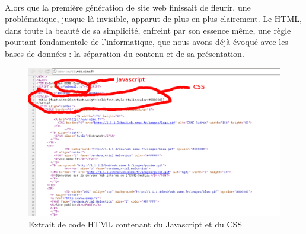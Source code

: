 {  
  \paragraph{} Alors que la première génération de site web finissait de fleurir, une
  problématique, jusque là invisible, apparut de plus en plus clairement. Le HTML, dans toute la
  beauté de sa simplicité, enfreint par son essence même, une règle pourtant fondamentale de
  l'informatique, que nous avons déjà évoqué avec les bases de données : la séparation du contenu et de
  sa présentation.

  \begin{figure}[h]
    \begin{center}
      \includegraphics[scale=0.3]{img/html-code-sample.png}
      \caption{Extrait de code HTML contenant du Javascript et du CSS}
      \label{middleware}
    \end{center}
  \end{figure}
}



